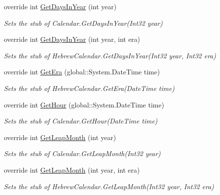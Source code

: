 \begin{DoxyCompactItemize}
override int \hyperlink{class_system_1_1_globalization_1_1_fakes_1_1_stub_hebrew_calendar_a9069c248a45f9f8747f6fb2cc83ca32e}{Get\-Days\-In\-Year} (int year)
\begin{DoxyCompactList}\small\item\em Sets the stub of Calendar.\-Get\-Days\-In\-Year(\-Int32 year)\end{DoxyCompactList}\item 
override int \hyperlink{class_system_1_1_globalization_1_1_fakes_1_1_stub_hebrew_calendar_acfb1bb9ac72b9a328246dc99a4c5cf11}{Get\-Days\-In\-Year} (int year, int era)
\begin{DoxyCompactList}\small\item\em Sets the stub of Hebrew\-Calendar.\-Get\-Days\-In\-Year(\-Int32 year, Int32 era)\end{DoxyCompactList}\item 
override int \hyperlink{class_system_1_1_globalization_1_1_fakes_1_1_stub_hebrew_calendar_a8f218defc9e45e6616f3ba904e34a53f}{Get\-Era} (global\-::\-System.\-Date\-Time time)
\begin{DoxyCompactList}\small\item\em Sets the stub of Hebrew\-Calendar.\-Get\-Era(\-Date\-Time time)\end{DoxyCompactList}\item 
override int \hyperlink{class_system_1_1_globalization_1_1_fakes_1_1_stub_hebrew_calendar_aaf4c6fc8bc007896af449be3cc07bb18}{Get\-Hour} (global\-::\-System.\-Date\-Time time)
\begin{DoxyCompactList}\small\item\em Sets the stub of Calendar.\-Get\-Hour(\-Date\-Time time)\end{DoxyCompactList}\item 
override int \hyperlink{class_system_1_1_globalization_1_1_fakes_1_1_stub_hebrew_calendar_a5e118546635f1e491e316546129a65fb}{Get\-Leap\-Month} (int year)
\begin{DoxyCompactList}\small\item\em Sets the stub of Calendar.\-Get\-Leap\-Month(\-Int32 year)\end{DoxyCompactList}\item 
override int \hyperlink{class_system_1_1_globalization_1_1_fakes_1_1_stub_hebrew_calendar_ab33e62489c274a8d2aa4f2570b2a72e0}{Get\-Leap\-Month} (int year, int era)
\begin{DoxyCompactList}\small\item\em Sets the stub of Hebrew\-Calendar.\-Get\-Leap\-Month(\-Int32 year, Int32 era)\end{DoxyCompactList}\item 

\end{DoxyCompactItemize}
